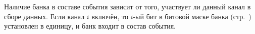 Наличие банка в составе события зависит от того, участвует ли данный канал в сборе данных. Если канал $i$ включён, то $i$-ый бит в битовой маске банка  (стр.~\pageref{sec_bank_info}) установлен в единицу, и банк  входит в состав события.













%

